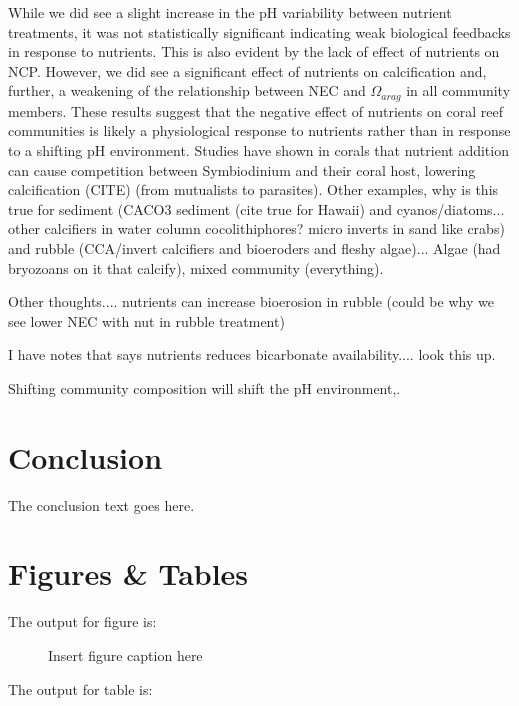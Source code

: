 \documentclass[]{rsos}%
\begin{document}
While we did see a slight increase in the pH variability between nutrient treatments, it was not statistically significant indicating weak biological feedbacks in response to nutrients. This is also evident by the lack of effect of nutrients on NCP. However, we did see a significant effect of nutrients on calcification and, further, a weakening of the relationship between NEC and $\Omega_{arag}$ in all community members. These results suggest that the negative effect of nutrients on coral reef communities is likely a physiological response to nutrients rather than in response to a shifting pH environment. Studies have shown in corals that nutrient addition can cause competition between Symbiodinium and their coral host, lowering calcification (CITE) (from mutualists to parasites).  Other examples, why is this true for sediment (CACO3 sediment (cite true for Hawaii) and cyanos/diatoms... other calcifiers in water column cocolithiphores? micro inverts in sand like crabs) and rubble (CCA/invert calcifiers and bioeroders and fleshy algae)...  Algae (had bryozoans on it that calcify), mixed community (everything). 

Other thoughts.... nutrients can increase bioerosion in rubble (could be why we see lower NEC with nut in rubble treatment)

I have notes that says nutrients reduces bicarbonate availability.... look this up.

Shifting community composition will shift the pH environment,. 

\section{Conclusion}
The conclusion text goes here.




\section{Figures \& Tables}

The output for figure is:

\begin{figure}[!h]
\caption{Insert figure caption here}
\label{fig_sim}
\end{figure}

\vspace*{-10pt}

\noindent The output for table is:
\end{document}
